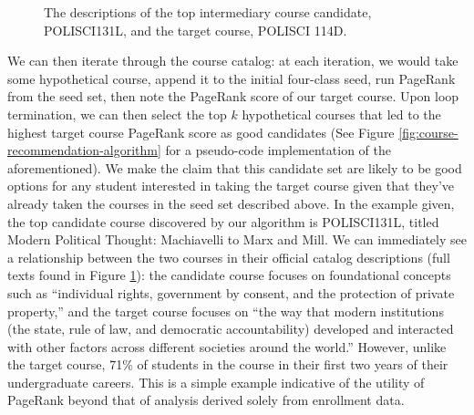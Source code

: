 \begin{figure}
    \centering
    \noindent{}
    \noindent{}
    \caption{The descriptions of the top intermediary course candidate, POLISCI131L, and the target course, POLISCI 114D.}
    \label{fig:pr-course-descriptions}
\end{figure}

We can then iterate through the course catalog: at each iteration, we would take some hypothetical course, append it to the initial four-class seed, run PageRank from the seed set, then note the PageRank score of our target course. Upon loop termination, we can then select the top $k$ hypothetical courses that led to the highest target course PageRank score as good candidates (See Figure \ref{fig:course-recommendation-algorithm} for a pseudo-code implementation of the aforementioned). We make the claim that this candidate set are likely to be good options for any student interested in taking the target course given that they've already taken the courses in the seed set described above. In the example given, the top candidate course discovered by our algorithm is POLISCI131L, titled Modern Political Thought: Machiavelli to Marx and Mill. We can immediately see a relationship between the two courses in their official catalog descriptions (full texts found in Figure \ref{fig:pr-course-descriptions}): the candidate course focuses on foundational concepts such as ``individual rights, government by consent, and the protection of private property,'' and the target course focuses on ``the way that modern institutions (the state, rule of law, and democratic accountability) developed and interacted with other factors across different societies around the world.'' However, unlike the target course, 71\% of students in the course in their first two years of their undergraduate careers. This is a simple example indicative of the utility of PageRank beyond that of analysis derived solely from enrollment data.

